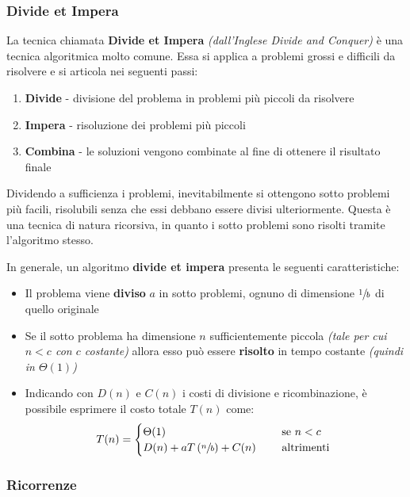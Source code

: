 \documentclass[italian, 10pt]{article}
\begin{document}
\subsubsection{Divide et Impera}
\label{sec:divide-et-impera}

La tecnica chiamata \textbf{Divide et Impera} \textit{(dall'Inglese Divide and Conquer)} è una tecnica algoritmica molto comune.
Essa si applica a problemi grossi e difficili da risolvere e si articola nei seguenti passi:

\begin{enumerate}
  \item \textbf{Divide} - divisione del problema in problemi più piccoli da risolvere
  \item \textbf{Impera} - risoluzione dei problemi più piccoli
  \item \textbf{Combina} - le soluzioni vengono combinate al fine di ottenere il risultato finale
\end{enumerate}

Dividendo a sufficienza i problemi, inevitabilmente si ottengono sotto problemi più facili, risolubili senza che essi debbano essere divisi ulteriormente.
Questa è una tecnica di natura ricorsiva, in quanto i sotto problemi sono risolti tramite l'algoritmo stesso.

\bigskip
In generale, un algoritmo \textbf{divide et impera} presenta le seguenti caratteristiche:

\begin{itemize}
  \item Il problema viene \textbf{diviso} \(a\) in sotto problemi, ognuno di dimensione \(\sfrac{1}{b}\) di quello originale
  \item Se il sotto problema ha dimensione \(n\) sufficientemente piccola \textit{(tale per cui \(n < c\) con \(c\) costante)} allora esso può essere \textbf{risolto} in tempo costante \textit{(quindi in \(\Theta(1)\))}
  \item Indicando con \(D(n)\) e \(C(n)\) i costi di divisione e ricombinazione, è possibile esprimere il costo totale \(T(n)\) come:
        \[ T(n) = \begin{cases} \Theta(1)                                 & \quad \text{ se } n < c   \\
              D(n) + aT\left(\sfrac{n}{b}\right) + C(n) & \quad \text{ altrimenti }
          \end{cases}\]
\end{itemize}

\subsubsection{Ricorrenze}
\end{document}
